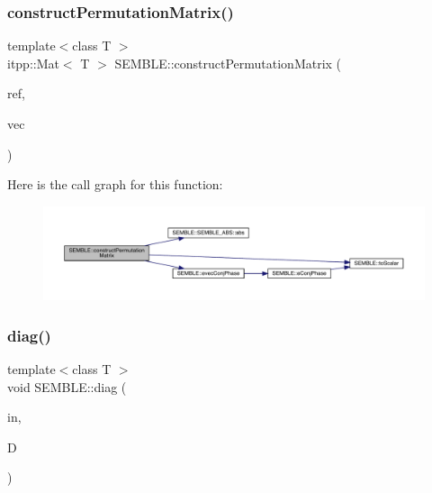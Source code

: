 \subsubsection{\texorpdfstring{constructPermutationMatrix()}{constructPermutationMatrix()}}
{\footnotesize\ttfamily template$<$class T $>$ \\
itpp\+::\+Mat$<$ T $>$ S\+E\+M\+B\+L\+E\+::construct\+Permutation\+Matrix (\begin{DoxyParamCaption}\item[{const itpp\+::\+Mat$<$ T $>$ \&}]{ref,  }\item[{const itpp\+::\+Mat$<$ T $>$ \&}]{vec }\end{DoxyParamCaption})}

Here is the call graph for this function\+:
\nopagebreak
\begin{figure}[H]
\begin{center}
\leavevmode
\includegraphics[width=350pt]{d7/dfd/namespaceSEMBLE_a7dfb8a829dce183cd58e280bd3fdd55c_cgraph}
\end{center}
\end{figure}
\mbox{\label{namespaceSEMBLE_a03aa1c70ca93395c3c1c0c43801121d7}} 
\subsubsection{\texorpdfstring{diag()}{diag()}\hspace{0.1cm}{\footnotesize\ttfamily [1/4]}}
{\footnotesize\ttfamily template$<$class T $>$ \\
void S\+E\+M\+B\+L\+E\+::diag (\begin{DoxyParamCaption}\item[{const \mbox{\hyperlink{structSEMBLE_1_1SembleVector}{Semble\+Vector}}$<$ T $>$ \&}]{in,  }\item[{\mbox{\hyperlink{structSEMBLE_1_1SembleMatrix}{Semble\+Matrix}}$<$ T $>$ \&}]{D }\end{DoxyParamCaption})}

